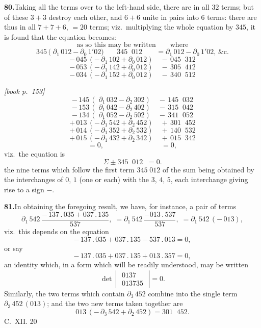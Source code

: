 \documentclass[11pt,a4paper]{article}
\theoremstyle{plain}
\theoremstyle{definition}
\theoremstyle{remark}
\begin{document}
\medskip\noindent\textbf{80.}\quad Taking all the terms over to the left-hand side, there are in all $32$ terms; but of these $3 + 3$ destroy each other, and $6 + 6$ unite in pairs into $6$ terms: there are thus in all $7 + 7 + 6$, $= 20$ terms; viz.\ multiplying the whole equation by $345$, it is found that the equation becomes:
\[
\text{as so this may be written}\qquad\text{where}
\]
\[
345\,(\;\partial_1\,012 - \partial_0\,1'02\bigr)\quad\;\;\;345\;\;\boxed{012}\;\;\;\;\;\;\;= \partial_1\,012 - \partial_0\,1'02,\,\&\text{c.}
\]
\[
-\,045\,(-\,\partial_1\,102 + \partial_0\,012)\quad -\,045\;\;\boxed{312}
\]
\[
-\,053\,(-\,\partial_1\,142 + \partial_0\,012)\quad -\,305\;\;\boxed{412}
\]
\[
-\,034\,(-\,\partial_1\,152 + \partial_0\,012)\quad -\,340\;\;\boxed{512}
\]

\medskip\noindent\textit{[book p.~153]}\quad
\[
-\,145\,(\;\partial_1\,032 - \partial_2\,302)\quad -\,145\;\;\boxed{032}
\]
\[
-\,153\,(\;\partial_1\,042 - \partial_2\,402)\quad -\,315\;\;\boxed{042}
\]
\[
-\,134\,(\;\partial_1\,052 - \partial_2\,502)\quad -\,341\;\;\boxed{052}
\]
\[
+\,013\,(-\,\partial_1\,542 + \partial_2\,452)\quad +\,301\;\;\boxed{452}
\]
\[
+\,014\,(-\,\partial_1\,352 + \partial_2\,532)\quad +\,140\;\;\boxed{532}
\]
\[
+\,015\,(-\,\partial_1\,432 + \partial_2\,342)\quad +\,015\;\;\boxed{342}
\]
\[
= 0,\hspace{8em}= 0,
\]
viz.\ the equation is
\[
\Sigma \pm 345\;\;\boxed{012}\;\; = 0.
\]
the nine terms which follow the first term $345\;\boxed{012}$ of the sum being obtained by the interchanges of $0$, $1$ (one or each) with the $3$, $4$, $5$, each interchange giving rise to a sign $-$.

\medskip\noindent\textbf{81.}\quad In obtaining the foregoing result, we have, for instance, a pair of terms
\[
\partial_1\,542\,\frac{-\,137\,.\,035 + 037\,.\,135}{537},\;= \partial_1\,542\,\frac{-013\,.\,537}{537},\;= \partial_1\,542\,(-\,013),
\]
viz.\ this depends on the equation
\[
-\,137\,.\,035 + 037\,.\,135 - 537\,.\,013 = 0,
\]
or say
\[
-\,137\,.\,035 + 037\,.\,135 + 013\,.\,357 = 0,
\]
an identity which, in a form which will be readily understood, may be written
\[
\det\,\left|\;\begin{array}{c}0137\\013735\end{array}\;\right| = 0.
\]
Similarly, the two terms which contain $\partial_3\,452$ combine into the single term $\partial_3\,452\,(013)$; and the two new terms taken together are
\[
013\,(-\,\partial_3\,542 + \partial_2\,452) = 301\;\;\boxed{452}.
\]
C.\ XII. \hfill 20
\end{document}
